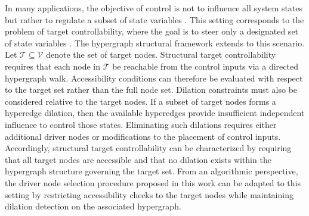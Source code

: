 \documentclass[journal,twoside,web]{ieeecolor}
\newcommand{\Ts}{\mathcal{T}}
\newcommand{\Vs}{\mathcal{V}}
\begin{document}
In many applications, the objective of control is not to influence all system states but rather to regulate a subset of state variables \cite{moore1981principal}.
%
This setting corresponds to the problem of target controllability, where the goal is to steer only a designated set of state variables \cite{gao2014target}.
The hypergraph structural framework extends to this scenario.
%
Let $\Ts\subseteq\Vs$ denote the set of target nodes.
%
Structural target controllability requires that each node in $\Ts$ be reachable from the control inputs via a directed hypergraph walk.
%
Accessibility conditions can therefore be evaluated with respect to the target set rather than the full node set.
Dilation constraints must also be considered relative to the target nodes.
%
If a subset of target nodes forms a hyperedge dilation, then the available hyperedges provide insufficient independent influence to control those states.
%
Eliminating such dilations requires either additional driver nodes or modifications to the placement of control inputs. Accordingly, structural target controllability can be characterized by requiring that all target nodes are accessible and that no dilation exists within the hypergraph structure governing the target set.
%
From an algorithmic perspective, the driver node selection procedure proposed in this work can be adapted to this setting by restricting accessibility checks to the target nodes while maintaining dilation detection on the associated hypergraph.
\end{document}
